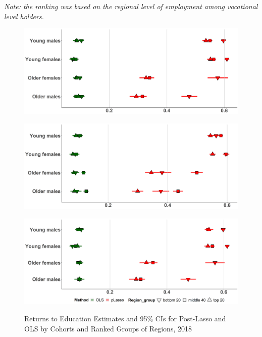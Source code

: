 \documentclass[alpha-refs]{wiley-article-04t}
\begin{document}
\begin{table}[H]
{\begin{tabular}{llllll}
			\hline
		\end{tabular}
}
\begin{tablenotes}
	\small
	\item \textit{Note: the ranking was based on the regional level of employment among vocational level holders.}
\end{tablenotes}
\end{table}


\begin{figure}[H]
	\begin{minipage}[b]{\linewidth}
		\centering
		\includegraphics[width=350pt]{iv_2_methods_1.png}
		\label{fig:5.4a}
	\end{minipage}
	\hfill
	\begin{minipage}[b]{\linewidth}
		\centering
		\includegraphics[width=350pt]{iv_2_methods_2.png}
		\label{fig:5.4b}
	\end{minipage}
	\hfill
	\begin{minipage}[b]{\linewidth}
		\centering
		\includegraphics[width=350pt]{iv_2_methods_3.png}
		\label{fig:5.4c}
	\end{minipage}
	\caption{Returns to Education Estimates and 95\% CIs for Post-Lasso and OLS by Cohorts and Ranked Groups of Regions, 2018}
	\label{fig:5.4}
\end{figure}
\end{document}
